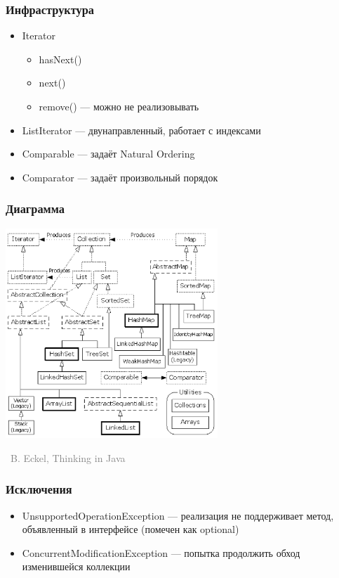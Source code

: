 \documentclass[xetex,mathserif,serif]{beamer}
\newcommand{\attribution}[1] {
\vspace{-5mm}\begin{flushright}\begin{scriptsize}\textcolor{gray}{\textcopyright\, #1}\end{scriptsize}\end{flushright}
}
\begin{document}
	\begin{frame}
		\frametitle{Инфраструктура}
		\begin{itemize}
			\item Iterator
			\begin{itemize}
				\item hasNext()
				\item next()
				\item remove() --- можно не реализовывать
			\end{itemize}
			\item ListIterator --- двунаправленный, работает с индексами
			\item Comparable --- задаёт Natural Ordering
			\item Comparator --- задаёт произвольный порядок
		\end{itemize}
	\end{frame}

	\begin{frame}
		\frametitle{Диаграмма}
		\begin{center}
			\includegraphics[width=0.6\textwidth]{java4Containers.png}
			\attribution{B. Eckel, Thinking in Java}
		\end{center}
	\end{frame}

	\begin{frame}
		\frametitle{Исключения}
		\begin{itemize}
			\item UnsupportedOperationException --- реализация не поддерживает метод, объявленный в интерфейсе (помечен как optional)
			\item ConcurrentModificationException --- попытка продолжить обход изменившейся коллекции
		\end{itemize}
	\end{frame}
\end{document}
